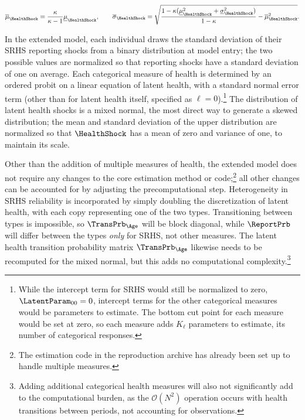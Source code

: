 \begin{equation*}
\overline{\mu}_\HealthShock = \frac{\kappa}{\kappa-1} \underline{\mu}_\HealthShock, \qquad \overline{\sigma}_\HealthShock = \sqrt{\frac{1 - \kappa(\underline{\mu}_\HealthShock^2 + \underline{\sigma}_\HealthShock^2)}{1-\kappa} - \overline{\mu}_\HealthShock^2}.
\end{equation*}

In the extended model, each individual draws the standard deviation of their SRHS reporting shocks from a binary distribution at model entry; the two possible values are normalized so that reporting shocks have a standard deviation of one on average.  Each categorical measure of health is determined by an ordered probit on a linear equation of latent health, with a standard normal error term (other than for latent health itself, specified as $\ell=0$).\footnote{While the intercept term for SRHS would still be normalized to zero, $\LatentParam_{00}=0$, intercept terms for the other categorical measures would be parameters to estimate.  The bottom cut point for each measure would be set at zero, so each measure adds $K_\ell$ parameters to estimate, its number of categorical responses.}  The distribution of latent health shocks is a mixed normal, the most direct way to generate a skewed distribution; the mean and standard deviation of the upper distribution are normalized so that $\HealthShock$ has a mean of zero and variance of one, to maintain its scale.

Other than the addition of multiple measures of health, the extended model does not require any changes to the core estimation method or code;\footnote{The estimation code in the reproduction archive has already been set up to handle multiple measures.} all other changes can be accounted for by adjusting the precomputational step.  Heterogeneity in SRHS reliability is incorporated by simply doubling the discretization of latent health, with each copy representing one of the two types.  Transitioning between types is impossible, so $\TransPrb_{\Age}$ will be block diagonal, while $\ReportPrb$ will differ between the types \textit{only} for SRHS, not other measures.  The latent health transition probability matrix $\TransPrb_{\Age}$ likewise needs to be recomputed for the mixed normal, but this adds no computational complexity.\footnote{Adding additional categorical health measures will also not significantly add to the computational burden, as the $\mathcal{O}(N^2)$ operation occurs with health transitions between periods, not accounting for observations.}